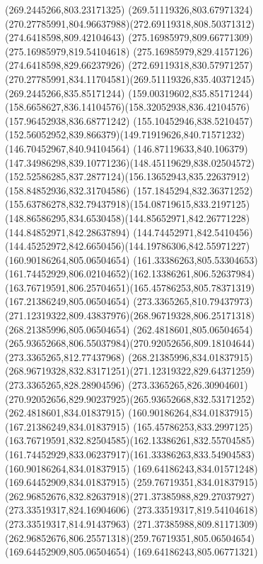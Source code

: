 {{		\lineto(269.2445266,803.23171325)
		\lineto(269.51119326,803.67971324)
		\curveto(270.27785991,804.96637988)(272.69119318,808.50371312)(274.6418598,809.42104643)
		\lineto(275.16985979,809.66771309)
		\lineto(275.16985979,819.54104618)
		\lineto(275.16985979,829.4157126)
		\lineto(274.6418598,829.66237926)
		\curveto(272.69119318,830.57971257)(270.27785991,834.11704581)(269.51119326,835.40371245)
		\lineto(269.2445266,835.85171244)
		\lineto(159.00319602,835.85171244)
		\curveto(158.6658627,836.14104576)(158.32052938,836.42104576)(157.96452938,836.68771242)
		\lineto(155.10452946,838.5210457)
		\curveto(152.56052952,839.866379)(149.71919626,840.71571232)(146.70452967,840.94104564)
		\curveto(146.87119633,840.106379)(147.34986298,839.10771236)(148.45119629,838.02504572)
		\curveto(152.52586285,837.2877124)(156.13652943,835.22637912)(158.84852936,832.31704586)
		\curveto(157.1845294,832.36371252)(155.63786278,832.79437918)(154.08719615,833.2197125)
		\curveto(148.86586295,834.6530458)(144.85652971,842.26771228)(144.84852971,842.28637894)
		\curveto(144.74452971,842.5410456)(144.45252972,842.6650456)(144.19786306,842.55971227)
		\moveto(160.90186264,805.06504654)
		\curveto(161.33386263,805.53304653)(161.74452929,806.02104652)(162.13386261,806.52637984)
		\curveto(163.76719591,806.25704651)(165.45786253,805.78371319)(167.21386249,805.06504654)
		\closepath
		\moveto(273.3365265,810.79437973)
		\curveto(271.12319322,809.43837976)(268.96719328,806.25171318)(268.21385996,805.06504654)
		\lineto(262.4818601,805.06504654)
		\curveto(265.93652668,806.55037984)(270.92052656,809.18104644)(273.3365265,812.77437968)
		\closepath
		\moveto(268.21385996,834.01837915)
		\curveto(268.96719328,832.83171251)(271.12319322,829.64371259)(273.3365265,828.28904596)
		\lineto(273.3365265,826.30904601)
		\curveto(270.92052656,829.90237925)(265.93652668,832.53171252)(262.4818601,834.01837915)
		\closepath
		\moveto(160.90186264,834.01837915)
		\lineto(167.21386249,834.01837915)
		\curveto(165.45786253,833.2997125)(163.76719591,832.82504585)(162.13386261,832.55704585)
		\curveto(161.74452929,833.06237917)(161.33386263,833.54904583)(160.90186264,834.01837915)
		\moveto(169.64186243,834.01571248)
		\lineto(169.64452909,834.01837915)
		\lineto(259.76719351,834.01837915)
		\curveto(262.96852676,832.82637918)(271.37385988,829.27037927)(273.33519317,824.16904606)
		\lineto(273.33519317,819.54104618)
		\lineto(273.33519317,814.91437963)
		\curveto(271.37385988,809.81171309)(262.96852676,806.25571318)(259.76719351,805.06504654)
		\lineto(169.64452909,805.06504654)
		\lineto(169.64186243,805.06771321)
}}
